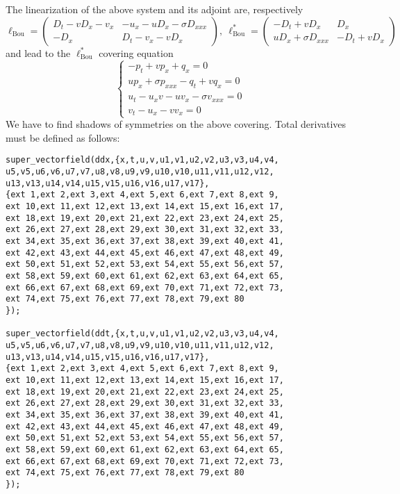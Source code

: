 The linearization of the above system and its adjoint are, respectively
\[
  \ell_{\text{Bou}}=
  \begin{pmatrix}
    D_t-vD_x-v_x & -u_x-uD_x-\sigma D_{xxx}\\
    -D_x & D_t-v_x-vD_x
  \end{pmatrix},\ 
  \ell^*_{\text{Bou}}=
  \begin{pmatrix}
    -D_t+vD_x & D_x\\
    uD_x+\sigma D_{xxx} & -D_t+vD_x
  \end{pmatrix}
\]
and lead to the $\ell^*_{\text{Bou}}$ covering equation
\[
  \label{cdiffeq:2}
  \left\{
  \begin{array}{l}
    -p_t+vp_x+q_x=0\\
    up_x+\sigma p_{xxx}-q_t+vq_x=0\\
  u_t-u_xv-uv_x-\sigma v_{xxx}=0\\
  v_t-u_x-vv_x=0
\end{array}
\right.
\]
We have to find shadows of symmetries on the above covering.
Total derivatives must be defined as follows:
\begin{verbatim}
super_vectorfield(ddx,{x,t,u,v,u1,v1,u2,v2,u3,v3,u4,v4,
u5,v5,u6,v6,u7,v7,u8,v8,u9,v9,u10,v10,u11,v11,u12,v12,
u13,v13,u14,v14,u15,v15,u16,v16,u17,v17},
{ext 1,ext 2,ext 3,ext 4,ext 5,ext 6,ext 7,ext 8,ext 9,
ext 10,ext 11,ext 12,ext 13,ext 14,ext 15,ext 16,ext 17,
ext 18,ext 19,ext 20,ext 21,ext 22,ext 23,ext 24,ext 25,
ext 26,ext 27,ext 28,ext 29,ext 30,ext 31,ext 32,ext 33,
ext 34,ext 35,ext 36,ext 37,ext 38,ext 39,ext 40,ext 41,
ext 42,ext 43,ext 44,ext 45,ext 46,ext 47,ext 48,ext 49,
ext 50,ext 51,ext 52,ext 53,ext 54,ext 55,ext 56,ext 57,
ext 58,ext 59,ext 60,ext 61,ext 62,ext 63,ext 64,ext 65,
ext 66,ext 67,ext 68,ext 69,ext 70,ext 71,ext 72,ext 73,
ext 74,ext 75,ext 76,ext 77,ext 78,ext 79,ext 80
});

super_vectorfield(ddt,{x,t,u,v,u1,v1,u2,v2,u3,v3,u4,v4,
u5,v5,u6,v6,u7,v7,u8,v8,u9,v9,u10,v10,u11,v11,u12,v12,
u13,v13,u14,v14,u15,v15,u16,v16,u17,v17},
{ext 1,ext 2,ext 3,ext 4,ext 5,ext 6,ext 7,ext 8,ext 9,
ext 10,ext 11,ext 12,ext 13,ext 14,ext 15,ext 16,ext 17,
ext 18,ext 19,ext 20,ext 21,ext 22,ext 23,ext 24,ext 25,
ext 26,ext 27,ext 28,ext 29,ext 30,ext 31,ext 32,ext 33,
ext 34,ext 35,ext 36,ext 37,ext 38,ext 39,ext 40,ext 41,
ext 42,ext 43,ext 44,ext 45,ext 46,ext 47,ext 48,ext 49,
ext 50,ext 51,ext 52,ext 53,ext 54,ext 55,ext 56,ext 57,
ext 58,ext 59,ext 60,ext 61,ext 62,ext 63,ext 64,ext 65,
ext 66,ext 67,ext 68,ext 69,ext 70,ext 71,ext 72,ext 73,
ext 74,ext 75,ext 76,ext 77,ext 78,ext 79,ext 80
});
\end{verbatim}
